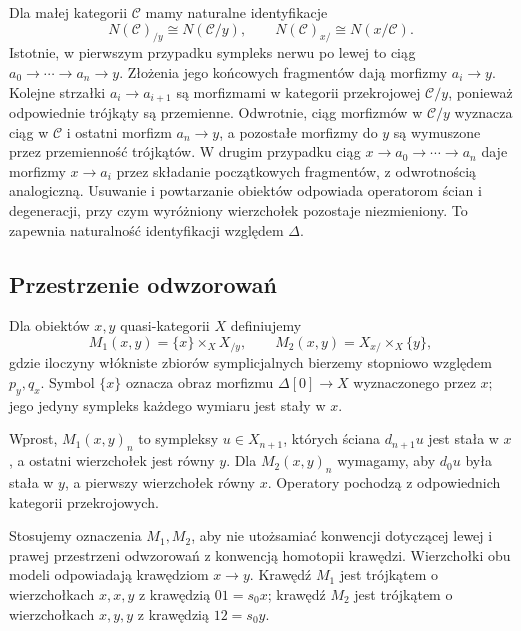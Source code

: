 \begin{przyklad}\label{cat:ex:quasicat-nerve-slices}
Dla małej kategorii $\mathcal C$ mamy naturalne identyfikacje
\[
 N(\mathcal C)_{/y}\cong N(\mathcal C/y),
 \qquad N(\mathcal C)_{x/}\cong N(x/\mathcal C).
\]
Istotnie, w pierwszym przypadku sympleks nerwu po lewej to ciąg $a_0\to\cdots\to a_n\to y$. Złożenia jego końcowych fragmentów dają morfizmy $a_i\to y$. Kolejne strzałki $a_i\to a_{i+1}$ są morfizmami w kategorii przekrojowej $\mathcal C/y$, ponieważ odpowiednie trójkąty są przemienne. Odwrotnie, ciąg morfizmów w $\mathcal C/y$ wyznacza ciąg w $\mathcal C$ i ostatni morfizm $a_n\to y$, a pozostałe morfizmy do $y$ są wymuszone przez przemienność trójkątów. W drugim przypadku ciąg $x\to a_0\to\cdots\to a_n$ daje morfizmy $x\to a_i$ przez składanie początkowych fragmentów, z odwrotnością analogiczną. Usuwanie i powtarzanie obiektów odpowiada operatorom ścian i degeneracji, przy czym wyróżniony wierzchołek pozostaje niezmieniony. To zapewnia naturalność identyfikacji względem $\Delta$.
\end{przyklad}

\subsection{Przestrzenie odwzorowań}

\begin{definicja}\label{cat:def:quasicat-mapping-spaces}
Dla obiektów $x,y$ quasi-kategorii $X$ definiujemy
\[
 M_1(x,y)=\{x\}\times_X X_{/y},
 \qquad
 M_2(x,y)=X_{x/}\times_X\{y\},
\]
gdzie iloczyny włókniste zbiorów symplicjalnych bierzemy stopniowo względem $p_y,q_x$. Symbol $\{x\}$ oznacza obraz morfizmu $\Delta[0]\to X$ wyznaczonego przez $x$; jego jedyny sympleks każdego wymiaru jest stały w $x$.

Wprost, $M_1(x,y)_n$ to sympleksy $u\in X_{n+1}$, których ściana $d_{n+1}u$ jest stała w $x$, a ostatni wierzchołek jest równy $y$. Dla $M_2(x,y)_n$ wymagamy, aby $d_0u$ była stała w $y$, a pierwszy wierzchołek równy $x$. Operatory pochodzą z odpowiednich kategorii przekrojowych.
\end{definicja}
Stosujemy oznaczenia $M_1,M_2$, aby nie utożsamiać konwencji dotyczącej lewej i prawej przestrzeni odwzorowań z konwencją homotopii krawędzi. Wierzchołki obu modeli odpowiadają krawędziom $x\to y$. Krawędź $M_1$ jest trójkątem o wierzchołkach $x,x,y$ z krawędzią $01=s_0x$; krawędź $M_2$ jest trójkątem o wierzchołkach $x,y,y$ z krawędzią $12=s_0y$.

